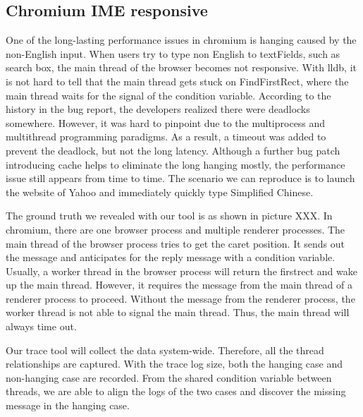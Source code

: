 \subsection{Chromium IME responsive}
One of the long-lasting performance issues in chromium is hanging caused by the non-English input.
When users try to type non English to textFields, such as search box,
the main thread of the browser becomes not responsive.
With lldb, it is not hard to tell that the main thread gets stuck on FindFirstRect,
where the main thread waits for the signal of the condition variable.
According to the history in the bug report, the developers realized there were deadlocks somewhere.
However, it was hard to pinpoint due to the multiprocess and multithread programming paradigms.
As a result, a timeout was added to prevent the deadlock, but not the long latency.
Although a further bug patch introducing cache helps to eliminate the long hanging mostly, 
the performance issue still appears from time to time.
The scenario we can reproduce is to launch the website of Yahoo and immediately quickly type Simplified Chinese.

The ground truth we revealed with our tool is as shown in picture XXX.
In chromium, there are one browser process and multiple renderer processes.
The main thread of the browser process tries to get the caret position.
It sends out the message and anticipates for the reply message with a condition variable.
Usually, a worker thread in the browser process will return the firstrect and wake up the main thread.
However, it requires the message from the main thread of a renderer process to proceed.
Without the message from the renderer process, the worker thread is not able to signal the main thread.
Thus, the main thread will always time out.

Our trace tool will collect the data system-wide.                                                                        
Therefore, all the thread relationships are captured.                                                                    
With the trace log size, both the hanging case and non-hanging case are recorded.                                           
From the shared condition variable between threads, we are able to align the logs of the two cases and discover the missing message in the hanging case.                                                                    
                                                                                                                            
